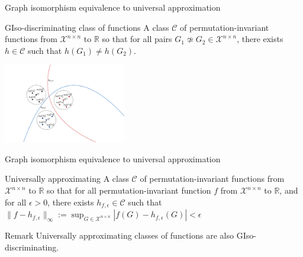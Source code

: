 \documentclass{beamer}
\begin{document}
\begin{frame}{Graph isomorphism equivalence to universal approximation}


\begin{block}{GIso-discriminating class of functions}
A class $\mathcal{C}$ of permutation-invariant functions from $\mathcal{X}^{n \times n}$ to $\mathbb{R}$ so that for all pairs  $G_1 \not \simeq G_2 \in \mathcal X^{n\times n}$,  there exists $ h \in \mathcal{C}$ such that $h(G_1) \neq h(G_2)$. 
\end{block}

\begin{center}
\includegraphics[width=0.4\textwidth,trim={6cm 3cm 14cm 4cm},clip]{figs/separating_functions_.pdf}
\end{center}
\let\thefootnote\relax{}
\end{frame}

\begin{frame}{Graph isomorphism equivalence to universal approximation}
\begin{block}{Universally approximating}
A class $\mathcal{C}$ of permutation-invariant functions from $\mathcal{X}^{n \times n}$ to $\mathbb{R}$ so that for all permutation-invariant function $f$ from $\mathcal{X}^{n \times n}$ to $\mathbb{R}$, and for all $\epsilon > 0$, there exists $h_{f,\epsilon} \in \mathcal{C}$ such that $\| f - h_{f,\epsilon} \|_{\infty} := \sup_{G \in \mathcal X^{n\times n}} |f(G) - h_{f,\epsilon}(G)| < \epsilon$
\end{block}

\bigskip

\begin{block}{Remark}
Universally approximating classes of functions are also GIso-discriminating.
\end{block}
\let\thefootnote\relax{}
\end{frame}
\end{document}
